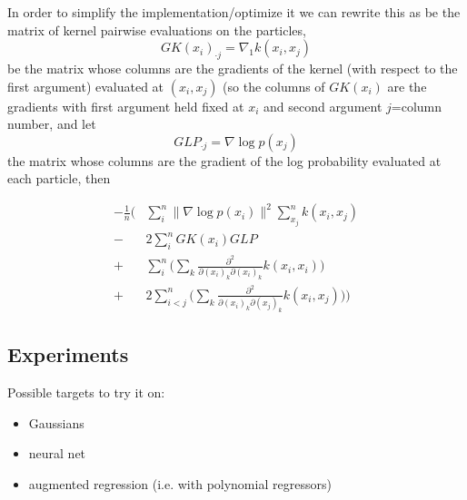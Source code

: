 \documentclass{article}
\begin{document}
In order to simplify the implementation/optimize it we can rewrite this as
be the matrix of kernel pairwise evaluations on the particles,
$$GK(x_i)_{\cdot j} = \nabla_{1} k(x_i,x_j)$$
be the matrix whose columns are the gradients of the kernel (with respect 
to the first argument) evaluated at $(x_i, x_j)$ (so the columns of $GK(x_i)$ are the gradients with first argument
held fixed at $x_i$ and second argument $j$=column number, and let 
$$GLP_{\cdot j} = \nabla \log p(x_j)$$
the matrix whose
columns are the gradient of the log probability evaluated at each particle, then


\begin{align}
    \label{eq:F_approx_matrix}
    - \frac{1}{n}  \Bigg( &\sum_{i}^n \| \nabla \log p(x_i) \|^2 \sum_{x_j}^{n}k(x_i,x_j) \\ 
    -& 2 \sum_{i}^n  GK(x_i) GLP  \\
    +& \sum_{i}^n \Big( \sum_k \frac{ \partial^2 }{ \partial (x_i)_k \partial (x_i)_k } k(x_i,x_i) \Big) \\ 
    +& 2\sum_{i<j}^n \Big( \sum_k \frac{ \partial^2 }{ \partial (x_i)_k \partial (x_j)_k } 
        k(x_i,x_j) \Big)\Bigg)
\end{align}

\subsection{Experiments}
Possible targets to try it on:
\begin{itemize}
    \item Gaussians
    \item neural net
    \item augmented regression (i.e. with polynomial regressors)
\end{itemize}
\end{document}

